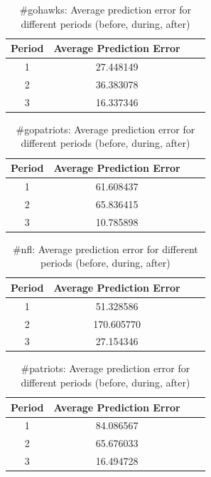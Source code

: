 \documentclass[12pt]{article}
\begin{document}
\begin{table}[H]
	\centering
	\begin{tabular}{| c | c | c | c |}
		\hline 
		Period & Average Prediction Error \\\hline
		1 & 27.448149 \\\hline
		2 & 36.383078 \\\hline 
		3 & 16.337346 \\\hline
	\end{tabular} 
	\caption{\#gohawks: Average prediction error for different periods (before, during, after)}
	\label{part1:tab1}
\end{table} 

\begin{table}[H]
	\centering
	\begin{tabular}{| c | c | c | c |}
		\hline 
		Period & Average Prediction Error \\\hline
		1 & 61.608437 \\\hline
		2 & 65.836415 \\\hline 
		3 & 10.785898 \\\hline
	\end{tabular} 
	\caption{\#gopatriots: Average prediction error for different periods (before, during, after)}
	\label{part1:tab1}
\end{table} 

\begin{table}[H]
	\centering
	\begin{tabular}{| c | c | c | c |}
		\hline 
		Period & Average Prediction Error \\\hline
		1 & 51.328586 \\\hline
		2 & 170.605770 \\\hline 
		3 & 27.154346 \\\hline
	\end{tabular} 
	\caption{\#nfl: Average prediction error for different periods (before, during, after)}
	\label{part1:tab1}
\end{table} 

\begin{table}[H]
	\centering
	\begin{tabular}{| c | c | c | c |}
		\hline 
		Period & Average Prediction Error \\\hline
		1 & 84.086567 \\\hline
		2 & 65.676033 \\\hline 
		3 & 16.494728 \\\hline
	\end{tabular} 
	\caption{\#patriots: Average prediction error for different periods (before, during, after)}
	\label{part1:tab1}
\end{table} 
\end{document}
